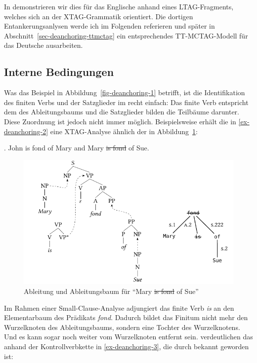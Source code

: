 In \cite{Lichte:Kallmeyer:10} demonstrieren wir dies für das Englische anhand eines LTAG-Fragments, welches sich an der XTAG-Grammatik \citep{xtag:01} orientiert. Die dortigen Entankerungsanlysen werde ich im Folgenden referieren und später in Abschnitt~\ref{sec-deanchoring-ttmctag} ein entsprechendes TT-MCTAG-Modell für das Deutsche ausarbeiten. 

\subsection{Interne Bedingungen} 

Was das Beispiel in Abbildung~\ref{fig-deanchoring-1} betrifft, ist die Identifikation des finiten Verbs und der Satzglieder im  recht einfach: Das finite Verb entspricht dem  des Ableitungsbaums und die Satzglieder bilden die Teilbäume darunter. Diese Zuordnung ist jedoch nicht immer möglich. Beispielsweise erhält die  in \ref{ex-deanchoring-2} eine XTAG-Analyse ähnlich der in Abbildung~\ref{fig-deanchoring-3}:    
  
\ex. \label{ex-deanchoring-2} John is fond of Mary and Mary \sout{is fond} of  Sue.\\
\citep[(4a)]{Lichte:Kallmeyer:10}

\begin{figure}[t]
\centering
\includegraphics{graphics/abb816.pdf}
\caption{\label{fig-deanchoring-3}Ableitung und Ableitungsbaum für "`Mary \sout{is fond} of Sue"' \citep[Abbildung~4]{Lichte:Kallmeyer:10}}
\end{figure} 
Im Rahmen einer Small-Clause-Analyse adjungiert das finite Verb {\it is} an den Elementarbaum des Prädikats {\it fond}. Dadurch bildet das Finitum nicht mehr den Wurzelknoten des Ableitungsbaums, sondern eine Tochter des Wurzelknotens. Und es kann sogar noch weiter vom Wurzelknoten entfernt sein. \cite{Lichte:Kallmeyer:10} verdeutlichen das anhand der Kontroll\-verb\-kette in \ref{ex-deanchoring-3}, die durch \cite{Ross:70} bekannt geworden ist:  

